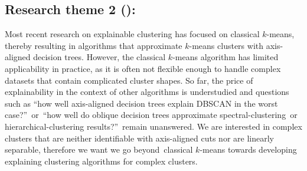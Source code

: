 \documentclass[a4paper,11pt]{article}
\begin{document}




\subsection*{Research theme 2 (\rtw): \clusterings}

Most recent research on explainable clustering has focused on classical $k$-means,
thereby resulting in algorithms that approximate $k$-means clusters with axis-aligned decision trees.
However, the classical $k$-means algorithm has limited applicability in practice, as it is often not flexible enough to handle complex datasets that contain complicated cluster shapes.
So far, the price of explainability in the context of other algorithms is understudied and questions such as ``how well axis-aligned decision trees explain DBSCAN in the worst case?''\ or\ ``how well do oblique decision trees approximate spectral-clustering~or hier\-archical-clustering results?''\ remain unanswered.
We are interested in complex clusters that are neither identifiable with axis-aligned cuts nor are linearly separable,
therefore we want we go beyond~classical $k$-means towards developing explaining clustering algorithms for complex clusters.
\end{document}

